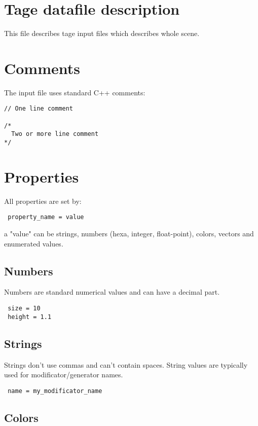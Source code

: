 \documentclass[11pt]{article}
\begin{document}
\section{Tage datafile description}

This file describes tage input files which describes whole scene.

\section{Comments}

The input file uses standard C++ comments:

\begin{verbatim}
// One line comment

/*
  Two or more line comment
*/
\end{verbatim}

\section{Properties}

All properties are set by:

\begin{verbatim}
 property_name = value
\end{verbatim}

a "value" can be strings, numbers (hexa, integer, float-point), colors, vectors
and enumerated values.

\subsection{Numbers}

Numbers are standard numerical values and can have a decimal part.

\begin{verbatim}
 size = 10
 height = 1.1
\end{verbatim}

\subsection{Strings}

Strings don't use commas and can't contain spaces. String values are typically 
used for modificator/generator names.

\begin{verbatim}
 name = my_modificator_name
\end{verbatim}

\subsection{Colors}
\end{document}
